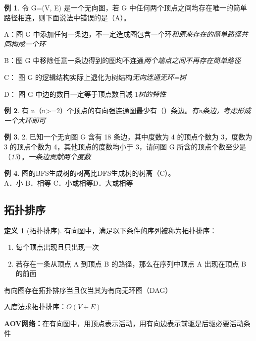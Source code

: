 \documentclass[hyperref,a4paper,UTF8,12pt]{ctexart}
\theoremstyle{definition}
\newtheorem{definition}[theorem]{定义}
\newtheorem{example}{例}[section]
\begin{document}
\begin{example}
    令 G=(V, E) 是一个无向图，若 G 中任何两个顶点之间均存在唯一的简单路径相连，则下面说法中错误的是（A）。

A：图 G 中添加任何一条边，不一定造成图包含一个环\quad\textit{和原来存在的简单路径共同构成一个环}

B：图 G 中移除任意一条边得到的图均不连通\quad\textit{两个端点之间不再存在简单路径}

C： 图 G 的逻辑结构实际上退化为树结构\quad\textit{无向连通无环=树}

D： 图 G 中边的数目一定等于顶点数目减 1\quad\textit{树的特性}
\end{example}
\begin{example}
    有 n（n>=2）个顶点的有向强连通图最少有（\quad）条边。\quad\textit{有n条边，考虑形成一个大环即可}
\end{example}
\begin{example}
2. 已知一个无向图 G 含有 18 条边，其中度数为 4 的顶点个数为 3，度数为 3 的顶点个数为 4，其他顶点的度数均小于 3，请问图 G 所含的顶点个数至少是（\textit{13}）。\quad\textit{一条边贡献两个度数}
\end{example}
\begin{example}
    图的BFS生成树的树高比DFS生成树的树高（C）。\\
A．小 \quad      B．相等    \quad   C．小或相等\quad    D．大或相等
\end{example}

\subsection{拓扑排序}
\begin{definition}[拓扑排序]有向图中，满足以下条件的序列被称为拓扑排序：
\begin{enumerate}
    \item 每个顶点出现且只出现一次
    \item 若存在一条从顶点 A 到顶点 B 的路径，那么在序列中顶点 A 出现在顶点 B 的前面
\end{enumerate}
\end{definition}
有向图存在拓扑排序当且仅当其为有向无环图（DAG）

入度法求拓扑排序：$O(V+E)$

\textbf{AOV网络：}在有向图中，用顶点表示活动，用有向边表示前驱是后驱必要活动条件
\end{document}
